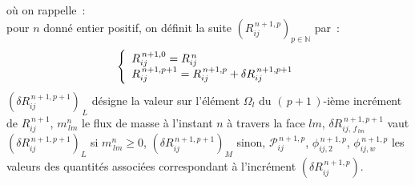 où on rappelle~:\\
pour $n$ donné entier positif, on définit la suite
 $({R}_{ij}^{\,n+1,p})_{p \in \mathbb{N}}$
 par~:
\begin{equation}\notag
\left\{\begin{array}{l}
{R}_{ij}^{\,n+1,0} = {R}_{ij}^{\,n}\\
{R}_{ij}^{\,n+1,p+1} = {R}_{ij}^{\,n+1,p} + \delta{R}_{ij}^{\,n+1,p+1} \\
\end{array}\right.
\end{equation}
$(\delta{R}_{ij}^{\,n+1,p+1})_{\,L}$ désigne la valeur sur l'élément
$\Omega_l$ du $\text{$(\,p+1\,)$-ième}$ incrément de ${R}_{ij}^{\,n+1}$,
$ m^n_{\,lm}$ le flux de masse à l'instant $n$ à travers la face $lm$,
$\delta R_{ij,\,f_{\,lm}}^{\,n+1,p+1}$ vaut $({\delta
R}_{ij}^{\,n+1,p+1})_{L}$  si $ m^n_{\,lm} \geqslant 0$, $({\delta
R}_{ij}^{\,n+1,p+1})_{M}$ sinon,
$\mathcal{P}^{\,n+1,p}_{ij}$, $\phi^{\,n+1,p}_{ij,2}$, $\phi^{\,n+1,p}_{ij,w}$ les valeurs
des quantités associées correspondant à l'incrément
$(\delta{R}_{ij}^{\,n+1,p})$.\\



